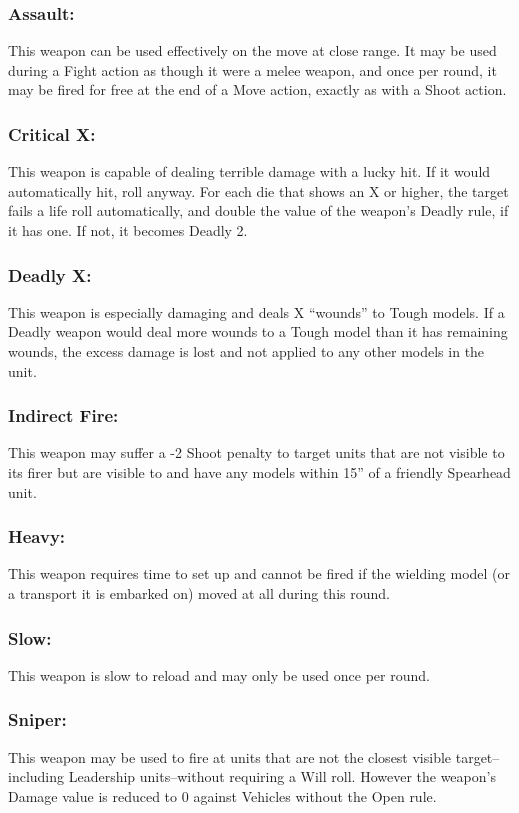 \begin{multicols}{2}
\subsubsection*{Assault:} This weapon can be used effectively on the move at close range. It may be used during a Fight action as though it were a melee weapon, and once per round, it may be fired for free at the end of a Move action, exactly as with a Shoot action.

\subsubsection*{Critical X:} This weapon is capable of dealing terrible damage with a lucky hit. If it would automatically hit, roll anyway. For each die that shows an X or higher, the target fails a life roll automatically, and double the value of the weapon's Deadly rule, if it has one. If not, it becomes Deadly 2.

\subsubsection*{Deadly X:} This weapon is especially damaging and deals X ``wounds'' to Tough models. If a Deadly weapon would deal more wounds to a Tough model than it has remaining wounds, the excess damage is lost and not applied to any other models in the unit.

\subsubsection*{Indirect Fire:} This weapon may suffer a -2 Shoot penalty to target units that are not visible to its firer but are visible to and have any models within 15'' of a friendly Spearhead unit.

\subsubsection*{Heavy:} This weapon requires time to set up and cannot be fired if the wielding model (or a transport it is embarked on) moved at all during this round.

\subsubsection*{Slow:} This weapon is slow to reload and may only be used once per round.

\subsubsection*{Sniper:} This weapon may be used to fire at units that are not the closest visible target--including Leadership units--without requiring a Will roll. However the weapon's Damage value is reduced to 0 against Vehicles without the Open rule.


\end{multicols}
